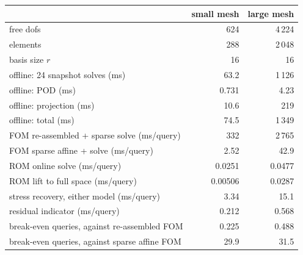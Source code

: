 \begin{tabular}{@{}lrr@{}}
\toprule
 & small mesh & large mesh \\
\midrule
free dofs & 624 & 4\,224 \\
elements & 288 & 2\,048 \\
basis size $r$ & 16 & 16 \\
\midrule
offline: 24 snapshot solves (ms) & 63.2 & 1\,126 \\
offline: POD (ms) & 0.731 & 4.23 \\
offline: projection (ms) & 10.6 & 219 \\
offline: total (ms) & 74.5 & 1\,349 \\
\midrule
FOM re-assembled + sparse solve (ms/query) & 332 & 2\,765 \\
FOM sparse affine + solve (ms/query) & 2.52 & 42.9 \\
ROM online solve (ms/query) & 0.0251 & 0.0477 \\
ROM lift to full space (ms/query) & 0.00506 & 0.0287 \\
stress recovery, either model (ms/query) & 3.34 & 15.1 \\
residual indicator (ms/query) & 0.212 & 0.568 \\
\midrule
break-even queries, against re-assembled FOM & 0.225 & 0.488 \\
break-even queries, against sparse affine FOM & 29.9 & 31.5 \\
\bottomrule
\end{tabular}
